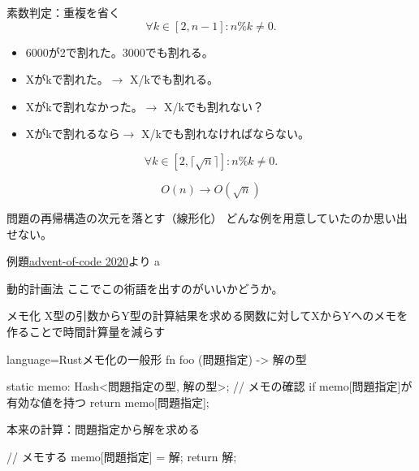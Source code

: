 \documentclass{beamer}
\begin{document}
\begin{frame}[fragile]{素数判定：重複を省く}{}
\[
\forall k \in [2, n-1] : n \% k \ne 0.
\]

\begin{itemize}%
\item 6000が2で割れた。3000でも割れる。
\item Xがkで割れた。$\to$ X/kでも割れる。
\item Xがkで割れなかった。$\to$ X/kでも割れない？
\item Xがkで割れるなら$\to$ X/kでも割れなければならない。
\end{itemize}

\[
\forall k \in [2, \lceil\sqrt{n}\rceil] : n \% k \ne 0.
\]

\[
O(n) \to O(\sqrt{n})
\]
\end{frame}

\begin{frame}[fragile]{問題の再帰構造の次元を落とす（線形化）}{}
どんな例を用意していたのか思い出せない。
\end{frame}

\begin{frame}[fragile]{例題}{\href{}{advent-of-code 2020}より}
a
\end{frame}

\begin{frame}[fragile]{動的計画法}{}
ここでこの術語を出すのがいいかどうか。
\end{frame}

\begin{frame}[fragile]{メモ化}{\href{https://ja.wikipedia.org/wiki/メモ化}{}}
X型の引数からY型の計算結果を求める関数に対してXからYへのメモを作ることで時間計算量を減らす
\begin{codeof}{language=Rust}{メモ化の一般形}
fn foo (問題指定) -> 解の型 {
  static memo: Hash<問題指定の型, 解の型>;
  // メモの確認
  if memo[問題指定]が有効な値を持つ {
    return memo[問題指定];
  }

   本来の計算：問題指定から解を求める

  // メモする
  memo[問題指定] = 解;
  return 解;
}
\end{codeof}

\end{frame}
\end{document}
